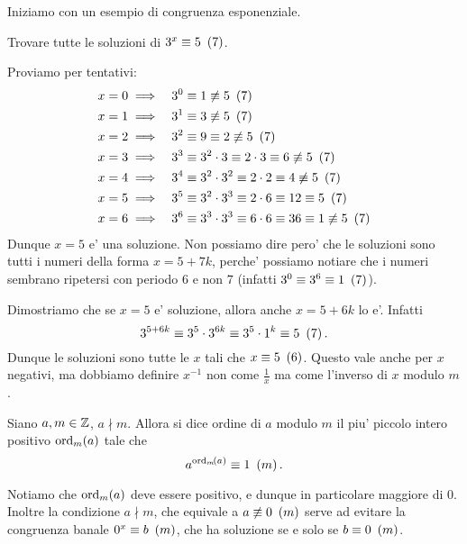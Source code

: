 Iniziamo con un esempio di congruenza esponenziale.
\begin{example}
    Trovare tutte le soluzioni di $3^x \equiv 5 \Mod{7}$.
\end{example}
\begin{solution}
    Proviamo per tentativi:
    \begin{alignat*}
        {2}
        &x = 0 \implies &&3^0 \equiv 1 \nequiv 5 \Mod{7}\\
        &x = 1 \implies &&3^1 \equiv 3 \nequiv 5 \Mod{7}\\
        &x = 2 \implies &&3^2 \equiv 9 \equiv 2 \nequiv 5 \Mod{7}\\
        &x = 3 \implies &&3^3 \equiv 3^2 \cdot 3 \equiv 2 \cdot 3 \equiv 6 \nequiv 5 \Mod{7}\\
        &x = 4 \implies &&3^4 \equiv 3^2 \cdot 3^2 \equiv 2 \cdot 2 \equiv 4 \nequiv 5 \Mod{7}\\
        &x = 5 \implies &&3^5 \equiv 3^2 \cdot 3^3 \equiv 2 \cdot 6 \equiv 12 \equiv 5 \Mod{7}\\
        &x = 6 \implies &&3^6 \equiv 3^3 \cdot 3^3 \equiv 6 \cdot 6 \equiv 36 \equiv 1 \nequiv 5 \Mod{7}
    \end{alignat*}
    Dunque $x = 5$ e' una soluzione. Non possiamo dire pero' che le soluzioni sono tutti i numeri della forma $x = 5 + 7k$, perche' possiamo notiare che i numeri sembrano ripetersi con periodo $6$ e non $7$ (infatti $3^0 \equiv 3^6 \equiv 1 \Mod{7}$). 

    Dimostriamo che se $x = 5$ e' soluzione, allora anche $x = 5 +6k$ lo e'. Infatti \[
        3^{5 + 6k} \equiv 3^5 \cdot 3^{6k} \equiv 3^5 \cdot 1^k \equiv 5 \Mod{7}.
    \]
    Dunque le soluzioni sono tutte le $x$ tali che $x \equiv 5 \Mod{6}$. Questo vale anche per $x$ negativi, ma dobbiamo definire $x^{-1}$ non come $\frac{1}{x}$ ma come l'inverso di $x$ modulo $m$.
\end{solution}

\begin{definition}
    Siano $a, m \in \Z$, $a \nmid m$. Allora si dice ordine di $a$ modulo $m$ il piu' piccolo intero positivo $\ord{a}{m}$ tale che \begin{equation}
        a^{\ord{a}{m}} \equiv 1 \Mod{m}.
    \end{equation}
\end{definition}

\begin{remark}
    Notiamo che $\ord{a}{m}$ deve essere positivo, e dunque in particolare maggiore di $0$. Inoltre la condizione $a \nmid m$, che equivale a $a \nequiv 0 \Mod{m}$ serve ad evitare la congruenza banale $0^x \equiv b \Mod{m}$, che ha soluzione se e solo se $b \equiv 0 \Mod{m}$.
\end{remark}

